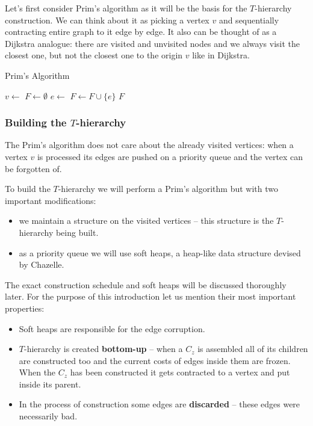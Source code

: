 Let's first consider Prim's algorithm as it will be the basis for the $T$-hierarchy construction. We can think about it as picking a vertex $v$ and sequentially contracting entire graph to it edge by edge. It also can be thought of as a Dijkstra analogue: there are visited and unvisited nodes and we always visit the closest one, but not the closest one to the origin $v$ like in Dijkstra.

\begin{algorithm}[H]
\caption{Prim's Algorithm}
\begin{algorithmic}[1]
    \State $v \gets$ 
    \State $F \gets \emptyset$
        \State $e \gets$ 
        \State {}  
        \State $F \gets F \cup \{e\}$
    \EndWhile
    \State \Return $F$
\EndFunction
\end{algorithmic}
\end{algorithm}
\FloatBarrier

\subsubsection{Building the $T$-hierarchy}
The Prim's algorithm does not care about the already visited vertices: when a vertex $v$ is processed its edges are pushed on a priority queue and the vertex can be forgotten of.

To build the $T$-hierarchy we will perform a Prim's algorithm but with two important modifications:
\begin{itemize}
    \item we maintain a structure on the visited vertices -- this structure is the $T$-hierarchy being built.
    \item as a priority queue we will use soft heaps, a heap-like data structure devised by Chazelle.
\end{itemize}

The exact construction schedule and soft heaps will be discussed thoroughly later. For the purpose of this introduction let us mention their most important properties:

\begin{itemize}
    \item Soft heaps are responsible for the edge corruption.
    \item $T$-hierarchy is created \textbf{bottom-up} -- when a $C_z$ is assembled all of its children are constructed too and the current costs of edges inside them are frozen. When the $C_z$ has been constructed it gets contracted to a vertex and put inside its parent.
    \item In the process of construction some edges are \textbf{discarded} -- these edges were necessarily bad.
\end{itemize}

